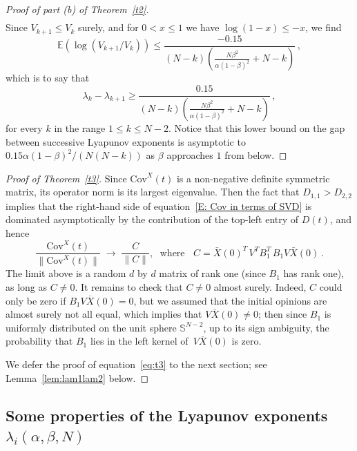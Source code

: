 \documentclass[12pt]{article}
\newcommand{\m}[1]{\texorpdfstring{$#1$}{}}
\newcommand{\Cov}{\mathrm{Cov}}
\newcommand{\1}{\mathbf{1}}
\begin{document}
\begin{proof}[Proof of part (b) of Theorem~\ref{t2}]
\begin{align*}
\end{align*}
Since $V_{k+1} \le V_k$ surely, and for $0 < x \le 1$ we have $\log(1-x) \le -x$, we find
$$\mathbb{E}(\log(V_{k+1}/V_k)) \le \frac{-0.15}{(N-k)\left(\frac{N\beta^2}{\alpha(1-\beta)^2} + N-k\right)}\,, $$
which is to say that
$$\lambda_{k}- \lambda_{k+1} \ge \frac{0.15}{(N-k)\left(\frac{N\beta^2}{\alpha(1-\beta)^2} + N-k\right)}\,,$$ for every $k$ in the range $1 \le k \le N-2$. 
Notice that this lower bound on the gap between successive Lyapunov exponents is asymptotic to  $0.15\alpha(1-\beta)^2/(N(N-k))$ as $\beta$ approaches $1$ from below. 
\end{proof}


\begin{proof}[Proof of Theorem~\ref{t3}]
Since $\Cov^X(t)$ is a non-negative definite symmetric matrix, its operator norm is its largest eigenvalue.  Then the fact that $D_{1,1} > D_{2,2}$ implies that the right-hand side of equation~\eqref{E: Cov in terms of SVD} is dominated asymptotically by the contribution of the top-left entry of $D(t)$, and hence $$\frac{ \Cov^X(t)}{\|\Cov^X(t)\|} \; \to \; \frac{C}{\|C\|}, \;\text{ where }\;\; C = \bar{X}(0)^T\,V^TB_1^T\,B_1V\bar{X}(0)\,.$$ The limit above is a random $d$ by $d$ matrix of rank one (since $B_1$ has rank one), as long as $C \neq 0$. It remains to check that $C \neq 0$ almost surely. Indeed, $C$ could only be zero if $B_1 V \overline{X}(0) = 0$, but we assumed that the initial opinions are almost surely not all equal, which implies that $V\overline{X}(0) \neq 0$; then since $B_1$ is uniformly distributed on the unit sphere $\mathbb{S}^{N-2}$, up to its sign ambiguity, the probability that $B_1$ lies in the left kernel of~$V\overline{X}(0)$ is zero. 

We defer the proof of equation~\eqref{eq:t3} to the next section; see Lemma~\ref{lem:lam1lam2} below.
\end{proof}

\subsection{Some properties of the Lyapunov exponents \m{\lambda_i(\alpha,\beta,N)}}\label{S: some properties}
\end{document}
